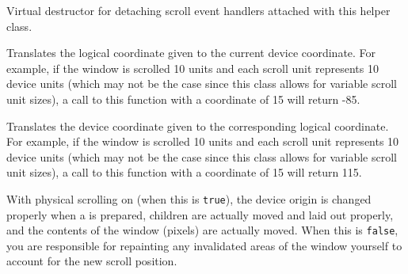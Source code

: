 
Virtual destructor for detaching scroll event handlers attached with this
helper class.


\label{wxvarscrollhelperbasecalcscrolledposition}


Translates the logical coordinate given to the current device coordinate.
For example, if the window is scrolled 10 units and each scroll unit
represents 10 device units (which may not be the case since this class allows
for variable scroll unit sizes), a call to this function with a coordinate of
15 will return -85.




\label{wxvarscrollhelperbasecalcunscrolledposition}


Translates the device coordinate given to the corresponding logical
coordinate. For example, if the window is scrolled 10 units and each scroll
unit represents 10 device units (which may not be the case since this class
allows for variable scroll unit sizes), a call to this function with a
coordinate of 15 will return 115.




\label{wxvarscrollhelperbaseenablephysicalscrolling}


With physical scrolling on (when this is {\tt true}), the device origin is
changed properly when a \rtfsp{} is prepared,
children are actually moved and laid out properly, and the contents of the
window (pixels) are actually moved. When this is {\tt false}, you are
responsible for repainting any invalidated areas of the window yourself to
account for the new scroll position.


\label{wxvarscrollhelperbaseestimatetotalsize}

